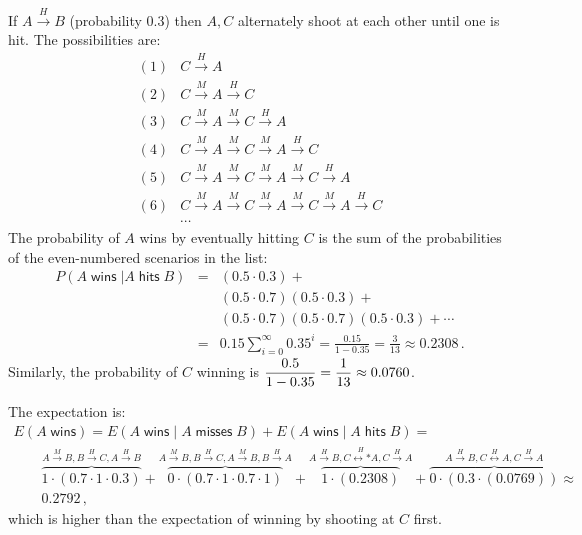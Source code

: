 If $A\stackrel{H}{\longrightarrow}B$ (probability $0.3$) then $A,C$ alternately shoot at each other until one is hit. The possibilities are:
\[
\begin{array}{ll}
(1)&C\stackrel{H}{\longrightarrow}A\\
(2)&C\stackrel{M}{\longrightarrow}A \stackrel{H}{\longrightarrow}C\\
(3)&C\stackrel{M}{\longrightarrow}A \stackrel{M}{\longrightarrow}C\stackrel{H}{\longrightarrow}A\\
(4)&C\stackrel{M}{\longrightarrow}A \stackrel{M}{\longrightarrow}C\stackrel{M}{\longrightarrow}A\stackrel{H}{\longrightarrow}C\\
(5)&C\stackrel{M}{\longrightarrow}A \stackrel{M}{\longrightarrow}C\stackrel{M}{\longrightarrow}A\stackrel{M}{\longrightarrow}C\stackrel{H}{\longrightarrow}A\\
(6)&C\stackrel{M}{\longrightarrow}A \stackrel{M}{\longrightarrow}C\stackrel{M}{\longrightarrow}A\stackrel{M}{\longrightarrow}C\stackrel{M}{\longrightarrow}A\stackrel{H}{\longrightarrow}C\\
&\cdots
\end{array}
\]
The probability of $A$ wins by eventually hitting $C$ is the sum of the probabilities of the even-numbered scenarios in the list:
\begin{eqnarray*}
P(A\;\textsf{wins} \;| A\; \textsf{hits}\;B )&=&(0.5 \cdot 0.3) + \\
&&(0.5 \cdot 0.7) (0.5 \cdot 0.3) + \\
&&(0.5 \cdot 0.7) (0.5 \cdot 0.7) (0.5 \cdot 0.3)+ \cdots\\
&=&0.15 \sum_{i=0}^{\infty} 0.35^i= \frac{0.15}{1-0.35}=\frac{3}{13}\approx 0.2308\,.
\end{eqnarray*}
Similarly, the probability of $C$ winning is $\displaystyle\frac{0.5}{1-0.35}=\displaystyle\frac{1}{13}\approx 0.0760$.

The expectation is:
\vspace*{-4ex}
\[
\renewcommand*{\arraystretch}{2.5}
\begin{array}{l}
E(A \;\textsf{wins}) =E(A \;\textsf{wins}\;|\;A\;\textsf{misses}\;B) + E(A \;\textsf{wins}\;|\;A\;\textsf{hits}\;B)=\\
\qquad
\overbrace{1\cdot (0.7\cdot 1\cdot 0.3)}%
^{A\stackrel{M}{\longrightarrow}B, B\stackrel{H}{\longrightarrow}C, A\stackrel{H}{\longrightarrow}B}+

\overbrace{0\cdot (0.7\cdot 1\cdot 0.7\cdot 1)}%
^{A\stackrel{M}{\longrightarrow}B, B\stackrel{H}{\longrightarrow}C,A\stackrel{M}{\longrightarrow}B,B\stackrel{H}{\longrightarrow}A} +

\overbrace{1\cdot (0.2308)}%
^{A\stackrel{H}{\longrightarrow}B, C\stackrel{H}{\longleftrightarrow*}A,C\stackrel{H}{\longrightarrow}A} +
\overbrace{0\cdot (0.3\cdot (0.0769))}%
^{A\stackrel{H}{\longrightarrow}B, C\stackrel{H}{\longleftrightarrow}A,C\stackrel{H}{\longrightarrow}A}
\approx\\
\qquad 0.2792\,,
\end{array}
\]
which is higher than the expectation of winning by shooting at $C$ first.

